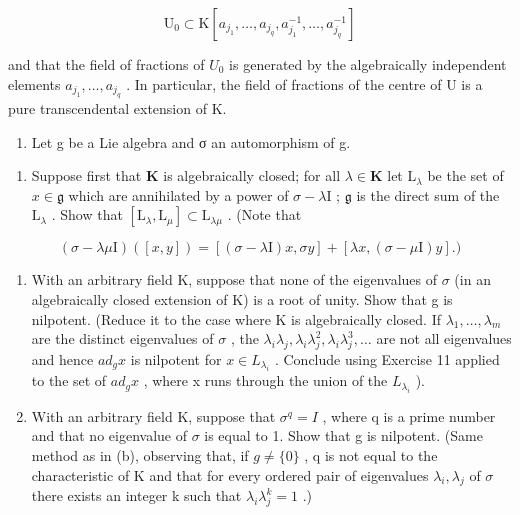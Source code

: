 \[
\mathrm{U} _ {0} \subset \mathrm{K} [ a _ {j _ {1}}, \dots , a _ {j _ {q}}, a _ {j _ {1}} ^ {- 1}, \dots , a _ {j _ {q}} ^ {- 1} ]
\]

and that the field of fractions of \(U_{0}\) is generated by the algebraically independent elements \(a_{j_{1}},\ldots,a_{j_{q}}\) . In particular, the field of fractions of the centre of U is a pure transcendental extension of K.

\begin{enumerate}
\def\labelenumi{\arabic{enumi}.}
\setcounter{enumi}{20}
\tightlist
\item
  Let g be a Lie algebra and σ an automorphism of g.
\end{enumerate}

\begin{enumerate}
\def\labelenumi{(\alph{enumi})}
\tightlist
\item
  Suppose first that \(\mathbf{K}\) is algebraically closed; for all \(\lambda \in \mathbf{K}\) let \(\mathrm{L}_{\lambda}\) be the set of \(x \in \mathfrak{g}\) which are annihilated by a power of \(\sigma - \lambda \mathrm{I}\) ; \(\mathfrak{g}\) is the direct sum of the \(\mathrm{L}_{\lambda}\) . Show that \([\mathrm{L}_{\lambda}, \mathrm{L}_{\mu}] \subset \mathrm{L}_{\lambda \mu}\) . (Note that
\end{enumerate}

\[
(\sigma - \lambda \mu \mathrm{I}) ([ x, y ]) = [ (\sigma - \lambda \mathrm{I}) x, \sigma y ] + [ \lambda x, (\sigma - \mu \mathrm{I}) y ].)
\]

\begin{enumerate}
\def\labelenumi{(\alph{enumi})}
\setcounter{enumi}{1}
\item
  With an arbitrary field K, suppose that none of the eigenvalues of \(\sigma\) (in an algebraically closed extension of K) is a root of unity. Show that g is nilpotent. (Reduce it to the case where K is algebraically closed. If \(\lambda_{1},\ldots,\lambda_{m}\) are the distinct eigenvalues of \(\sigma\) , the \(\lambda_{i}\lambda_{j},\lambda_{i}\lambda_{j}^{2},\lambda_{i}\lambda_{j}^{3},\ldots\) are not all eigenvalues and hence \(ad_{g}x\) is nilpotent for \(x\in L_{\lambda_{i}}\) . Conclude using Exercise 11 applied to the set of \(ad_{g}x\) , where x runs through the union of the \(L_{\lambda_{i}}\) ).
\item
  With an arbitrary field K, suppose that \(\sigma^{q}=I\) , where q is a prime number and that no eigenvalue of \(\sigma\) is equal to 1. Show that g is nilpotent. (Same method as in (b), observing that, if \(g\neq\{0\}\) , q is not equal to the characteristic of K and that for every ordered pair of eigenvalues \(\lambda_{i},\lambda_{j}\) of \(\sigma\) there exists an integer k such that \(\lambda_{i}\lambda_{j}^{k}=1\) .)
\end{enumerate}

